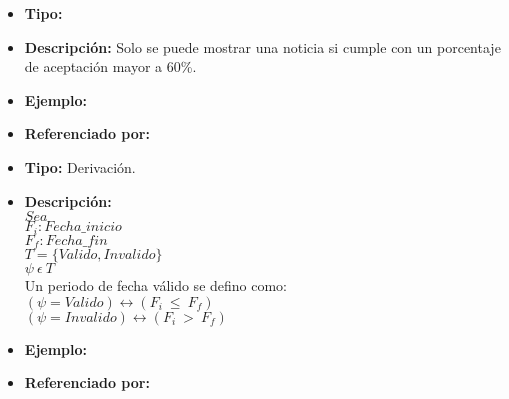 
    \begin{itemize}
      \item \textbf{Tipo:}  
      \item \textbf{Descripción:} Solo se puede mostrar una noticia si cumple con un porcentaje de aceptación mayor a 60\%.
      \item \textbf{Ejemplo:}
      \item \textbf{Referenciado por:}  \\
    \end{itemize}


    \begin{itemize}
      \item \textbf{Tipo:} Derivación.
      \item \textbf{Descripción:}\\
      $Sea$\\

      $F_i:Fecha\_inicio$\\
      $F_f:Fecha\_fin$\\

      $T=\{Valido,Invalido\}$\\
      $\psi\ \epsilon\ T$\\

      Un periodo de fecha válido se defino como:\\

      $(\psi=Valido)\leftrightarrow(F_i\ \leq\ F_f)$\\
      $(\psi=Invalido)\leftrightarrow(F_i\ >\ F_f)$\\
      \item \textbf{Ejemplo:}
      \item \textbf{Referenciado por:}  \\
    \end{itemize}



